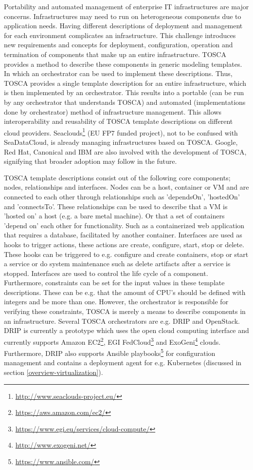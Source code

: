 Portability and automated management of enterprise IT infrastructures are major concerns. Infrastructures may need to run on heterogeneous components due to application needs. Having different descriptions of deployment and management for each environment complicates an infrastructure. This challenge introduces new requirements and concepts for deployment, configuration, operation and termination of components that make up an entire infrastructure. TOSCA provides a method to describe these components in generic modeling templates. In which an orchestrator can be used to implement these descriptions. Thus, TOSCA provides a single template description for an entire infrastructure, which is then implemented by an orchestrator. This results into a portable (can be run by any orchestrator that understands TOSCA) and automated (implementations done by orchestrator) method of infrastructure management. This allows interoperability and reusability of TOSCA template descriptions on different cloud providers. Seaclouds\footnote{\url{http://www.seaclouds-project.eu/}} (EU FP7 funded project), not to be confused with SeaDataCloud, is already managing infrastructures based on TOSCA. Google, Red Hat, Canonical and IBM are also involved with the development of TOSCA, signifying that broader adoption may follow in the future.

TOSCA template descriptions consist out of the following core components; nodes, relationships and interfaces. Nodes can be a host, container or VM and are connected to each other through relationships such as 'dependsOn', 'hostedOn' and 'connectsTo'. These relationships can be used to describe that a VM is 'hosted on' a host (e.g. a bare metal machine). Or that a set of containers 'depend on' each other for functionality. Such as a containerized web application that requires a database, facilitated by another container. Interfaces are used as hooks to trigger actions, these actions are create, configure, start, stop or delete. These hooks can be triggered to e.g. configure and create containers, stop or start a service or do system maintenance such as delete artifacts after a service is stopped. Interfaces are used to control the life cycle of a component. Furthermore, constraints can be set for the input values in these template descriptions. These can be e.g. that the amount of CPU's should be defined with integers and be more than one. However, the orchestrator is responsible for verifying these constraints, TOSCA is merely a means to describe components in an infrastructure. Several TOSCA orchestrators are e.g. DRIP and OpenStack. DRIP is currently a prototype which uses the open cloud computing interface and currently supports Amazon EC2\footnote{\url{https://aws.amazon.com/ec2/}}, EGI FedCloud\footnote{\url{https://www.egi.eu/services/cloud-compute/}} and ExoGeni\footnote{\url{http://www.exogeni.net/}} clouds. Furthermore, DRIP also supports Ansible playbooks\footnote{\url{https://www.ansible.com/}} for configuration management and contains a deployment agent for e.g. Kubernetes (discussed in section \ref{overview-virtualization}). 

